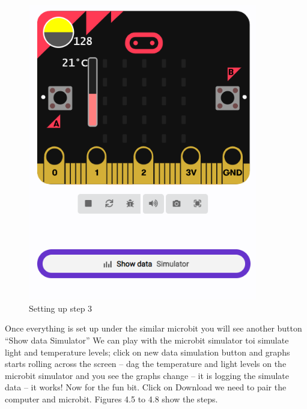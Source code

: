 \begin{figure}
    \centering
    \includegraphics[width=10cm]{chapters/ChapterP2-datalog/figures/datalog4.png}
    \caption{Setting up step 3}
    \label{fig:datalogstep3}
\end{figure}

Once everything is set up under the similar microbit you will see another button “Show data Simulator” We can play with the microbit simulator toi simulate light and temperature levels; click on new data simulation button and graphs starts rolling across the screen – dag the temperature and light levels on the microbit simulator and you see the graphs change – it is logging the simulate data – it works!
Now for the fun bit.
Click on Download we need to pair the computer and microbit. Figures 4.5 to 4.8 show the steps.
 
